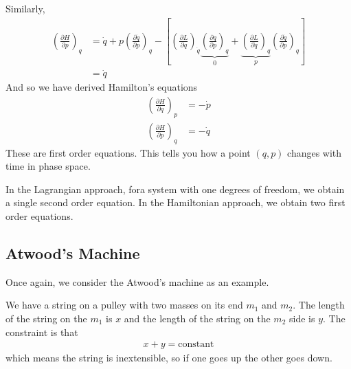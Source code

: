 Similarly,
\begin{align}
    \left( \frac{\partial H}{\partial p} \right)_{q}
    &=
    \dot{q}
    +
    p \left( \frac{\partial \dot{q}}{\partial p} \right)_{q}
    -
    \left[ 
    \left( \frac{\partial L}{\partial q} \right)_{\dot{q}}
    \underbrace{\left( \frac{\partial q}{\partial p} \right)_{q}}_{0}
    +
    \underbrace{\left( \frac{\partial L}{\partial \dot{q}}
    \right)_{q}}_{p}
    \left( \frac{\partial \dot{q}}{\partial p} \right)_{q}
    \right]\\
    &= \dot{q}
\end{align}
And so we have derived Hamilton's equations
\begin{align}
    \left( \frac{\partial H}{\partial q} \right)_{p} &= -\dot{p}\\
    \left( \frac{\partial H}{\partial p} \right)_{q} &= -\dot{q}
\end{align}
These are first order equations.
This tells you how a point $(q,p)$ changes with time in phase space.

In the Lagrangian approach,
fora system with one degrees of freedom,
we obtain a single second order equation.
In the Hamiltonian approach,
we obtain two first order equations.

\subsection{Atwood's Machine}
Once again,
we consider the Atwood's machine as an example.

We have a string on a pulley with two masses on its end
$m_1$ and $m_2$.
The length of the string on the $m_1$ is  $x$
and the length of the string on the $m_2$ side is $y$.
The constraint is that
\begin{align}
    x + y = \textrm{constant}
\end{align}
which means the string is inextensible,
so if one goes up the other goes down.

